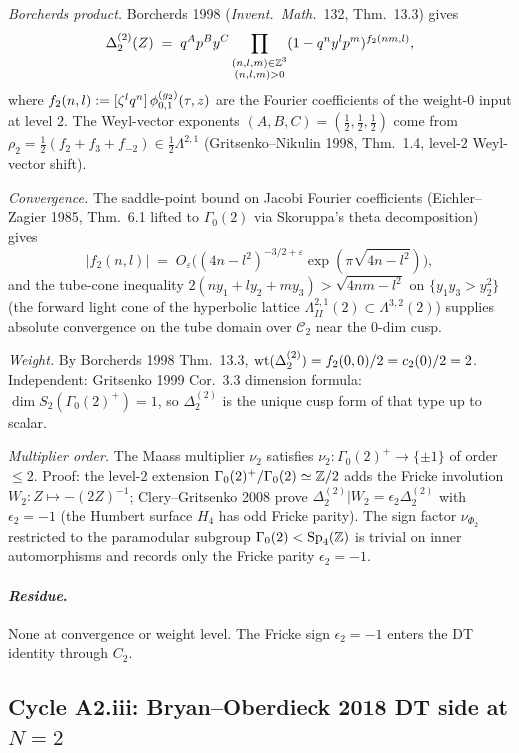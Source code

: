\emph{Borcherds product.} Borcherds 1998 (\emph{Invent.\ Math.}~132,
Thm.~13.3) gives
\[
  \Delta_2^{(2)}(Z)
  \;=\; q^A p^B y^C
      \prod_{\substack{(n, l, m) \in \mathbb{Z}^3 \\ (n, l, m) > 0}}
        (1 - q^n y^l p^m)^{f_2(nm, l)},
\]
where $f_2(n, l) := [\zeta^l q^n]\,\phi^{(g_2)}_{0,1}(\tau, z)$ are the Fourier
coefficients of the weight-$0$ input at level $2$.
The Weyl-vector exponents $(A, B, C) = (\tfrac12, \tfrac12, \tfrac12)$
come from $\rho_2 = \tfrac12(f_2 + f_3 + f_{-2}) \in \tfrac12\Lambda^{2,1}$
(Gritsenko--Nikulin 1998, Thm.~1.4, level-$2$ Weyl-vector shift).

\emph{Convergence.} The saddle-point bound on Jacobi Fourier
coefficients (Eichler--Zagier 1985, Thm.~6.1 lifted to $\Gamma_0(2)$
via Skoruppa's theta decomposition) gives
\[
  |f_2(n, l)| \;=\; O_\varepsilon\bigl((4n - l^2)^{-3/2+\varepsilon}
  \exp(\pi\sqrt{4n - l^2})\bigr),
\]
and the tube-cone inequality $2(ny_1 + ly_2 + my_3) > \sqrt{4nm - l^2}$
on $\{y_1 y_3 > y_2^2\}$ (the forward light cone of the hyperbolic
lattice $\Lambda^{2,1}_{II}(2) \subset \Lambda^{3,2}(2)$) supplies
absolute convergence on the tube domain over $\mathcal{C}_2$ near the
$0$-dim cusp.

\emph{Weight.} By Borcherds 1998 Thm.~13.3,
$\operatorname{wt}(\Delta_2^{(2)}) = f_2(0, 0)/2 = c_2(0)/2 = 2$.
Independent: Gritsenko 1999 Cor.~3.3 dimension formula:
$\dim S_2(\Gamma_0(2)^+) = 1$, so $\Delta_2^{(2)}$ is the unique cusp
form of that type up to scalar.

\emph{Multiplier order.} The Maass multiplier $\nu_2$ satisfies
$\nu_2 \colon \Gamma_0(2)^+ \to \{\pm 1\}$ of order $\leq 2$.
Proof: the level-$2$ extension
$\Gamma_0(2)^+ / \Gamma_0(2) \simeq \mathbb{Z}/2$ adds the Fricke involution
$W_2 \colon Z \mapsto -(2Z)^{-1}$; Clery--Gritsenko 2008 prove
$\Delta_2^{(2)}|W_2 = \epsilon_2 \Delta_2^{(2)}$ with $\epsilon_2 = -1$
(the Humbert surface $H_4$ has odd Fricke parity). The sign factor
$\nu_{\Phi_2}$ restricted to the paramodular subgroup
$\Gamma_0(2) < \operatorname{Sp}_4(\mathbb{Z})$ is trivial on inner automorphisms and
records only the Fricke parity $\epsilon_2 = -1$.

\paragraph{\emph{Residue}.} None at convergence or weight level.
The Fricke sign $\epsilon_2 = -1$ enters the DT identity through $C_2$.

\subsection{Cycle A2.iii: Bryan--Oberdieck 2018 DT side at $N = 2$}
\label{subsec:a2-cycle-iii}

